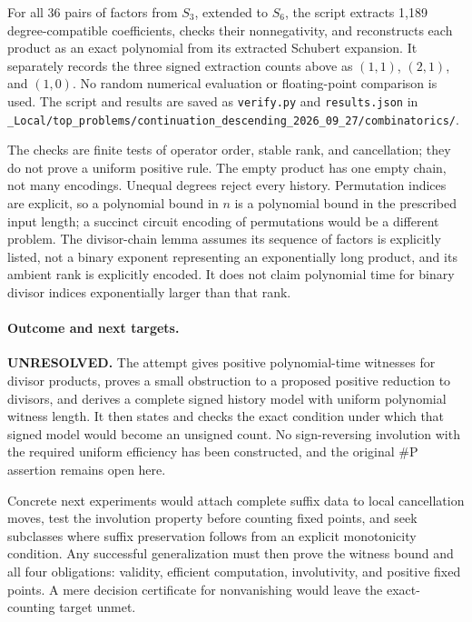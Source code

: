 \documentclass[11pt]{article}
\begin{document}
For all 36 pairs of factors from $S_3$, extended to $S_6$, the script
extracts 1,189 degree-compatible coefficients, checks their nonnegativity,
and reconstructs each product as an exact polynomial from its extracted
Schubert expansion. It separately records the three signed extraction
counts above as $(1,1)$, $(2,1)$, and $(1,0)$. No random numerical
evaluation or floating-point comparison is used. The script and results
are saved as \texttt{verify.py} and \texttt{results.json} in
\nolinkurl{_Local/top_problems/continuation_descending_2026_09_27/combinatorics/}.

The checks are finite tests of operator order, stable rank, and cancellation;
they do not prove a uniform positive rule. The empty product has one empty
chain, not many encodings. Unequal degrees reject every history. Permutation
indices are explicit, so a polynomial bound in $n$ is a polynomial bound
in the prescribed input length; a succinct circuit encoding of permutations
would be a different problem. The divisor-chain lemma assumes its sequence
of factors is explicitly listed, not a binary exponent representing an
exponentially long product, and its ambient rank is explicitly encoded.
It does not claim polynomial time for binary divisor indices exponentially
larger than that rank.

\paragraph{Outcome and next targets.}
\textbf{UNRESOLVED.} The attempt gives positive polynomial-time witnesses
for divisor products, proves a small obstruction to a proposed positive
reduction to divisors, and derives a complete signed history model with
uniform polynomial witness length. It then states and checks the exact
condition under which that signed model would become an unsigned count.
No sign-reversing involution with the required uniform efficiency has been
constructed, and the original $\#\mathrm P$ assertion remains open here.

Concrete next experiments would attach complete suffix data to local
cancellation moves, test the involution property before counting fixed
points, and seek subclasses where suffix preservation follows from an
explicit monotonicity condition. Any successful generalization must then
prove the witness bound and all four obligations: validity, efficient
computation, involutivity, and positive fixed points. A mere decision
certificate for nonvanishing would leave the exact-counting target unmet.
\end{document}
